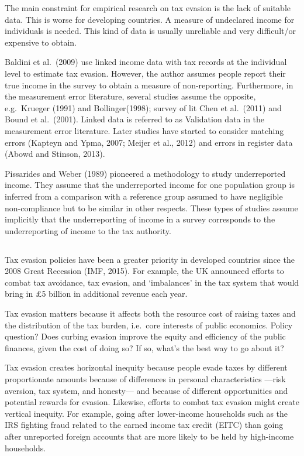 \documentclass[
  12pt]{article}
\theoremstyle{definition}
\theoremstyle{remark}
\begin{document}
The main constraint for empirical research on tax evasion is the lack of
suitable data. This is worse for developing countries. A measure of
undeclared income for individuals is needed. This kind of data is
usually unreliable and very difficult/or expensive to obtain.

Baldini et al.~(2009) use linked income data with tax records at the
individual level to estimate tax evasion. However, the author assumes
people report their true income in the survey to obtain a measure of
non-reporting. Furthermore, in the measurement error literature, several
studies assume the opposite, e.g.~Krueger (1991) and Bollinger(1998);
survey of lit Chen et al.~(2011) and Bound et al.~(2001). Linked data is
referred to as Validation data in the measurement error literature.
Later studies have started to consider matching errors (Kapteyn and
Ypma, 2007; Meijer et al., 2012) and errors in register data (Abowd and
Stinson, 2013).

Pissarides and Weber (1989) pioneered a methodology to study
underreported income. They assume that the underreported income for one
population group is inferred from a comparison with a reference group
assumed to have negligible non-compliance but to be similar in other
respects. These types of studies assume implicitly that the
underreporting of income in a survey corresponds to the underreporting
of income to the tax authority.

\subsection{\texorpdfstring{\citet{Slemrod2019}}{@Slemrod2019}}\label{slemrod2019}

Tax evasion policies have been a greater priority in developed countries
since the 2008 Great Recession (IMF, 2015). For example, the UK
announced efforts to combat tax avoidance, tax evasion, and `imbalances'
in the tax system that would bring in \pounds 5 billion in additional
revenue each year.

Tax evasion matters because it affects both the resource cost of raising
taxes and the distribution of the tax burden, i.e.~core interests of
public economics. Policy question? Does curbing evasion improve the
equity and efficiency of the public finances, given the cost of doing
so? If so, what's the best way to go about it?

Tax evasion creates horizontal inequity because people evade taxes by
different proportionate amounts because of differences in personal
characteristics ---risk aversion, tax system, and honesty--- and because
of different opportunities and potential rewards for evasion. Likewise,
efforts to combat tax evasion might create vertical inequity. For
example, going after lower-income households such as the IRS fighting
fraud related to the earned income tax credit (EITC) than going after
unreported foreign accounts that are more likely to be held by
high-income households.
\end{document}
